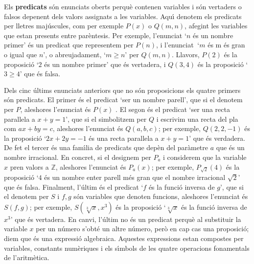 Els \textbf{predicats} s\'{o}n enunciats oberts perqu\`{e} contenen
variables i s\'{o}n vertaders o falsos depenent dels valors assignats a les
variables. Aqu\'{\i} denotem els predicats per lletres maj\'{u}scules, com
per exemple $P(x)$ o $Q(m,n)$, afegint les variables que estan presents
entre par\`{e}ntesis. Per exemple, l'enunciat `$n$ \'{e}s un nombre primer'
\'{e}s un predicat que representem per $P(n)$, i l'enunciat $\ $`$m$ \'{e}s m%
\'{e}s gran o igual que $n$', o abreujadament, `$m\geq n$' per $Q(m,n)$.
Llavors, $P(2)$ \'{e}s la proposici\'{o} `$2$ \'{e}s un nombre primer' que
\'{e}s vertadera, i $Q(3,4)$ \'{e}s la proposici\'{o} `$3\geq4$' que \'{e}s
falsa.

Dels cinc \'{u}ltims enunciats anteriors que no s\'{o}n proposicions els
quatre primers s\'{o}n predicats. El primer \'{e}s el predicat `ser un
nombre parell', que si el denotem per $P$, aleshores l'enunciat \'{e}s $P(x)$%
. El segon \'{e}s el predicat `ser una recta paral\textperiodcentered lela a
$x+y=1$', que si el simbolitzem per $Q$ i escrivim una recta del pla com $%
ax+by=c$, aleshores l'enunciat \'{e}s $Q(a,b,c)$; per exemple, $Q(2,2,-1)$
\'{e}s la proposici\'{o} `$2x+2y=-1$ \'{e}s una recta
paral\textperiodcentered lela a $x+y=1$' que \'{e}s verdadera. De fet el
tercer \'{e}s una fam\'{\i}lia de predicats que dep\`{e}n del par\`{a}metre $%
a$ que \'{e}s un nombre irracional. En concret, si el designem per $P_{a}$ i
considerem que la variable $x$ pren valors a $\mathbb{Z}$, aleshores
l'enunciat \'{e}s $P_{a}(x)$; per exemple, $P_{\sqrt{2}}(4)$ \'{e}s la
proposici\'{o} `$4$ \'{e}s un nombre enter parell m\'{e}s gran que el nombre
irracional $\sqrt{2}$' que \'{e}s falsa. Finalment, l'\'{u}ltim \'{e}s el
predicat `$f$ \'{e}s la funci\'{o} inversa de $g$', que si el denotem per $S$
i $f,g$ s\'{o}n variables que denoten funcions, aleshores l'enunciat \'{e}s $%
S(f,g)$; per exemple, $S(\sqrt[3]{x},x^{3})$ \'{e}s la proposici\'{o} `$\sqrt%
[3]{x}$ \'{e}s la funci\'{o} inversa de $x^{3}$' que \'{e}s vertadera. En
canvi, l'\'{u}ltim no \'{e}s un predicat perqu\`{e} al substituir la
variable $x$ per un n\'{u}mero s'obt\'{e} un altre n\'{u}mero, per\`{o} en
cap cas una proposici\'{o}; diem que \'{e}s una expressi\'{o} algebraica.
Aquestes expressions estan compostes per variables, constants num\`{e}riques
i els s\'{\i}mbols de les quatre operacions fonamentals de l'aritm\`{e}tica.

